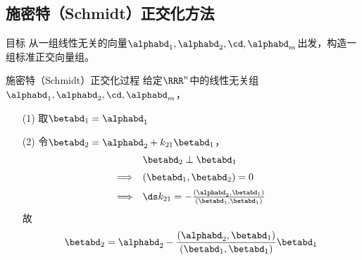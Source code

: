 \subsection{施密特（Schmidt）正交化方法}
\begin{frame}
  \begin{footnotesize}
    \begin{block}{目标}
      从一组线性无关的向量$\alphabd_1,\alphabd_2,\cd,\alphabd_m$出发，构造一组标准正交向量组。
    \end{block}
  \end{footnotesize}
\end{frame}


\begin{frame}
  \begin{footnotesize}
    \begin{block}{施密特（Schmidt）正交化过程}
      给定$\RRR^n$中的线性无关组$\alphabd_1,\alphabd_2,\cd,\alphabd_m$，
      \begin{itemize}
      \item[(1)] 取$\betabd_1=\alphabd_1$
      \item[(2)] 令$\betabd_2=\alphabd_2+k_{21}\betabd_1$，
        $$
        \begin{array}{rl}
          &\betabd_2\perp\betabd_1\\[0.2cm]
          \Longrightarrow&(\betabd_1,\betabd_2)=0\\[0.2cm]
          \Longrightarrow& \ds k_{21}=-\frac{(\alphabd_2,\betabd_1)}{(\betabd_1,\betabd_1)}
        \end{array}
        $$
        故
        $$
        \betabd_2=\alphabd_2-\frac{(\alphabd_2,\betabd_1)}{(\betabd_1,\betabd_1)}\betabd_1
        $$
      \end{itemize}
    \end{block}

  \end{footnotesize}
\end{frame}


